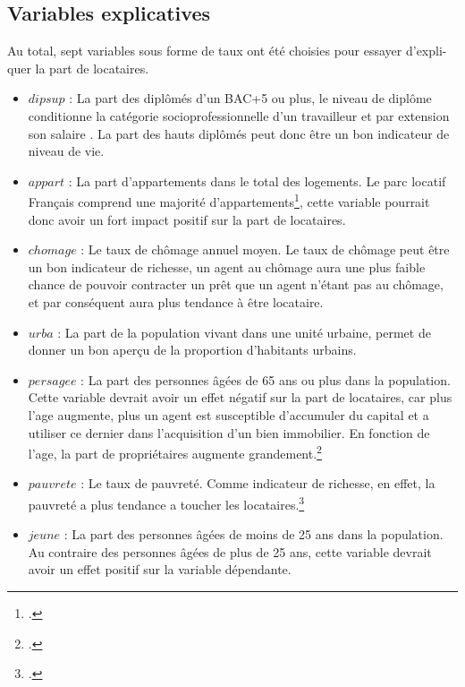 \documentclass[12pt]{article}
\begin{document}
\subsection{Variables explicatives}
Au total, sept variables sous forme de taux ont été choisies pour essayer d'expli-quer la part de locataires.
\begin{itemize}
    \item $dipsup$ : La part des diplômés d'un BAC+5 ou plus, le niveau de diplôme conditionne la catégorie socioprofessionnelle d'un travailleur et par extension son salaire
        . La part des hauts diplômés peut donc être un bon indicateur de niveau de vie.
    \item $appart$ : La part d'appartements dans le total des logements. Le parc locatif Français comprend une majorité d'appartements\footcite{part_appart}, cette variable pourrait donc
        avoir un fort impact positif sur la part de locataires.
    \item $chomage$ : Le taux de chômage annuel moyen. Le taux de chômage peut être un bon indicateur de richesse, un agent au chômage aura une plus faible chance de pouvoir contracter
        un prêt que un agent n'étant pas au chômage, et par conséquent aura plus tendance à être locataire.
    \item $urba$ : La part de la population vivant dans une unité urbaine, permet de donner un bon aperçu de la proportion d'habitants urbains.
    \item $persagee$ : La part des personnes âgées de 65 ans ou plus dans la population. Cette variable devrait avoir un effet négatif sur la part de locataires, car plus l'age augmente, plus
        un agent est susceptible d'accumuler du capital et a utiliser ce dernier dans l'acquisition d'un bien immobilier. En fonction de l'age, la part de propriétaires augmente grandement.\footcite{part_appart}
    \item $pauvrete$ : Le taux de pauvreté. Comme indicateur de richesse, en effet, la pauvreté a plus tendance a toucher les locataires.\footcite{pauvrete_locataires}
    \item $jeune$ : La part des personnes âgées de moins de 25 ans dans la population. Au contraire des personnes âgées de plus de 25 ans, cette variable devrait avoir un effet positif sur
        la variable dépendante.
    \end{itemize}
\end{document}
